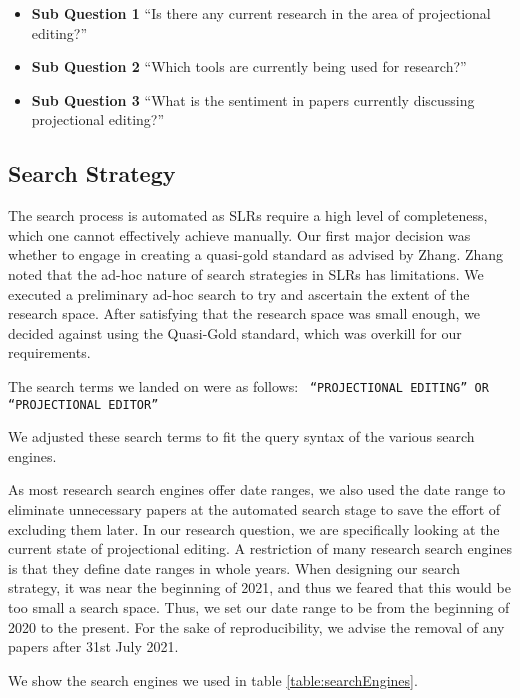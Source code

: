 \begin{itemize}
    \item \textbf{Sub Question 1} ``Is there any current research in the area of projectional editing?''
    \item \textbf{Sub Question 2} ``Which tools are currently being used for research?''
    \item \textbf{Sub Question 3} ``What is the sentiment in papers currently discussing projectional editing?''
\end{itemize}


\subsection{Search Strategy}

The search process is automated as SLRs require a high level of completeness, which one cannot effectively achieve manually.
Our first major decision was whether to engage in creating a quasi-gold standard as advised by Zhang\cite{Zhang_2011}.
Zhang noted that the ad-hoc nature of search strategies in SLRs has limitations.
We executed a preliminary ad-hoc search to try and ascertain the extent of the research space.
After satisfying that the research space was small enough, we decided against using the Quasi-Gold standard, which was overkill for our requirements.

The search terms we landed on were as follows:
{\obeylines\obeyspaces
\texttt{
    ``PROJECTIONAL EDITING'' 
       OR 
    ``PROJECTIONAL EDITOR'' 
}}

We adjusted these search terms to fit the query syntax of the various search engines.

As most research search engines offer date ranges, we also used the date range to eliminate unnecessary papers at the automated search stage to save the effort of excluding them later.
In our research question, we are specifically looking at the current state of projectional editing.
A restriction of many research search engines is that they define date ranges in whole years.
When designing our search strategy, it was near the beginning of 2021, and thus we feared that this would be too small a search space. 
Thus, we set our date range to be from the beginning of 2020 to the present.
For the sake of reproducibility, we advise the removal of any papers after 31st July 2021.

We show the search engines we used in table \ref{table:searchEngines}.

